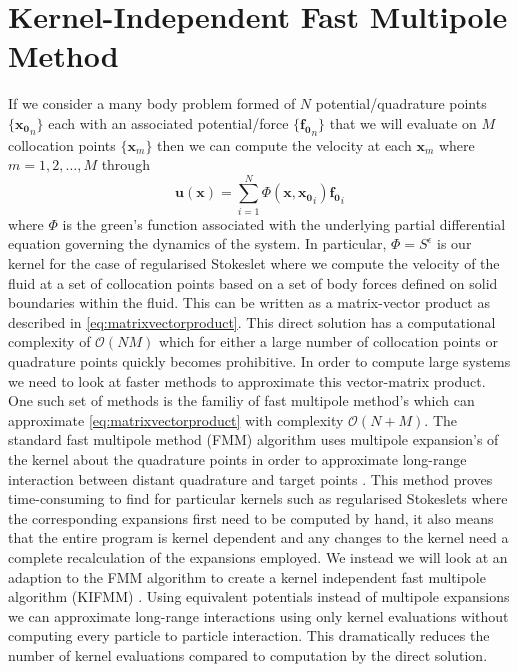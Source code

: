 \section{Kernel-Independent Fast Multipole Method}
If we consider a many body problem formed of $N$ potential/quadrature points $\{\mathbf{x_{0}}_n\}$ each with an associated potential/force $\{\mathbf{f_{0}}_n\}$ that we will evaluate on $M$ collocation points $\{\mathbf{x}_m\}$ then we can compute the velocity at each $\mathbf{x}_m$ where $m=1,2,\dots,M$ through
\begin{equation*}
    \mathbf{u}(\mathbf{x}) = \sum_{i=1}^N \Phi(\mathbf{x},\mathbf{x_{0}}_i)\mathbf{f_{0}}_i
\end{equation*}
where $\Phi$ is the green's function associated with the underlying partial differential equation governing the dynamics of the system. In particular, $\Phi=S^\epsilon$ is our kernel for the case of regularised Stokeslet where we compute the velocity of the fluid at a set of collocation points based on a set of body forces defined on solid boundaries within the fluid. This can be written as a matrix-vector product as described in \cref{eq:matrixvectorproduct}. This direct solution has a computational complexity of $\mathcal{O}(NM)$ which for either a large number of collocation points or quadrature points quickly becomes prohibitive. In order to compute large systems we need to look at faster methods to approximate this vector-matrix product. One such set of methods is the familiy of fast multipole method's which can approximate \cref{eq:matrixvectorproduct} with complexity $\mathcal{O}(N+M)$. The standard fast multipole method (FMM) algorithm uses multipole expansion's of the kernel about the quadrature points in order to approximate long-range interaction between distant quadrature and target points \cite{Beatson,Tornberg2008,Wang2007AEquations,Yokota}. This method proves time-consuming to find for particular kernels such as regularised Stokeslets where the corresponding expansions first need to be computed by hand, it also means that the entire program is kernel dependent and any changes to the kernel need a complete recalculation of the expansions employed.
We instead we will look at an adaption to the FMM algorithm to create a kernel independent fast multipole algorithm (KIFMM) \cite{Ying2004, Ying2005,Rostami2016Kernel-independentStokeslets,Yan}. Using equivalent potentials instead of multipole expansions we can approximate long-range interactions using only kernel evaluations without computing every particle to particle interaction. This dramatically reduces the number of kernel evaluations compared to computation by the direct solution. 

